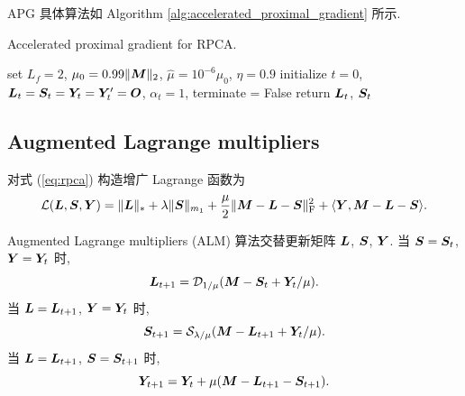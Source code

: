 \documentclass[12pt]{article}
\begin{document}
APG 具体算法如 Algorithm \ref{alg:accelerated_proximal_gradient} 所示.

\begin{algorithm}[!htbp]
  \label{alg:accelerated_proximal_gradient}
  \caption{Accelerated proximal gradient for RPCA.}
  set $L_f=2$, $\mu_0=0.99\|\bm{M}\|_2$, $\hat{\mu}=10^{-6}\mu_0$, $\eta=0.9$\;
  initialize $t=0$, $\bm{L}_t=\bm{S}_t=\bm{Y}_t=\bm{Y}'_t=\bm{O}$, $\alpha_t=1$, terminate = False\;
  return $\bm{L}_t$, $\bm{S}_t$\;
\end{algorithm}

\subsection{Augmented Lagrange multipliers}

对式 (\ref{eq:rpca}) 构造增广 Lagrange 函数为
\begin{equation}
  \mathcal{L}(\bm{L},\bm{S},\bm{Y})=\|\bm{L}\|_{*}+\lambda\|\bm{S}\|_{m_1}+\frac{\mu}{2}\|\bm{M}-\bm{L}-\bm{S}\|_{\text{F}}^2+\langle\bm{Y},\bm{M}-\bm{L}-\bm{S}\rangle.
\end{equation}

Augmented Lagrange multipliers (ALM) \cite{yuan2009sparse,lin2010augmented,candes2011robust} 算法交替更新矩阵 $\bm{L}$, $\bm{S}$, $\bm{Y}$. 当 $\bm{S}=\bm{S}_{t}$, $\bm{Y}=\bm{Y}_t$ 时,
\begin{equation}
  \bm{L}_{t+1}
  =\mathcal{D}_{1/\mu}(\bm{M}-\bm{S}_t+\bm{Y}_t/\mu).
\end{equation}
当 $\bm{L}=\bm{L}_{t+1}$, $\bm{Y}=\bm{Y}_t$ 时,
\begin{equation}
  \bm{S}_{t+1}
  =\mathcal{S}_{\lambda/\mu}(\bm{M}-\bm{L}_{t+1}+\bm{Y}_t/\mu).
\end{equation}
当 $\bm{L}=\bm{L}_{t+1}$, $\bm{S}=\bm{S}_{t+1}$ 时,
\begin{equation}
  \bm{Y}_{t+1}
  =\bm{Y}_t+\mu(\bm{M}-\bm{L}_{t+1}-\bm{S}_{t+1}).
\end{equation}
\end{document}
